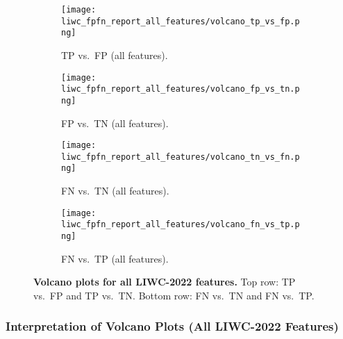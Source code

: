 \begin{figure}[H]
  \centering
  
  \begin{subfigure}[t]{0.49\textwidth}
    \centering
    \texttt{[image: liwc\_fpfn\_report\_all\_features/volcano\_tp\_vs\_fp.png]}
    \caption{TP vs.\ FP (all features).} %
    \label{fig:volcano_all_tp_vs_fp}
  \end{subfigure}\hfill
  \begin{subfigure}[t]{0.49\textwidth}
    \centering
    \texttt{[image: liwc\_fpfn\_report\_all\_features/volcano\_fp\_vs\_tn.png]}
    \caption{FP vs.\ TN (all features).}
    \label{fig:volcano_all_tp_vs_tn}
  \end{subfigure}
  
  \vspace{0.5cm}
  
  \begin{subfigure}[t]{0.49\textwidth}
    \centering
    \texttt{[image: liwc\_fpfn\_report\_all\_features/volcano\_tn\_vs\_fn.png]}
    \caption{FN vs.\ TN (all features).}
    \label{fig:volcano_all_fn_vs_tn}
  \end{subfigure}\hfill
  \begin{subfigure}[t]{0.49\textwidth}
    \centering
    \texttt{[image: liwc\_fpfn\_report\_all\_features/volcano\_fn\_vs\_tp.png]}
    \caption{FN vs.\ TP (all features).}
    \label{fig:volcano_all_fn_vs_tp}
  \end{subfigure}

  \caption[Volcano plots for all LIWC-2022 features.]{\textbf{Volcano plots for all LIWC-2022 features.} 
  Top row: TP vs.\ FP and TP vs.\ TN. Bottom row: FN vs.\ TN and FN vs.\ TP.}
  \label{fig:volcano_all_features}
\end{figure}

\subsubsection{Interpretation of Volcano Plots (All LIWC-2022 Features)}


